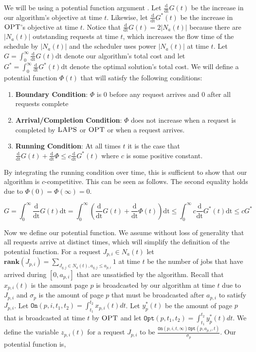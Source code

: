 \documentclass[11pt]{article}
\newcommand{\opt}{\textrm{\sc OPT}}
\newcommand{\laps}{\textrm{\sc LAPS}}
\newcommand{\On}{\texttt{On}}
\newcommand{\Opt}{\texttt{Opt}}
\newcommand{\ddphi}{\frac{\mathrm{d}}{\mathrm{dt}} \Phi}
\newcommand{\ddopt}{\frac{\mathrm{d}}{\mathrm{dt}} G^*}
\newcommand{\ddhopt}{\frac{\mathrm{d}}{\mathrm{dt}} G^*}
\newcommand{\ddg}{\frac{\mathrm{d}}{\mathrm{dt}} G}
\newcommand{\dt}{\mathrm{dt}}
\newcommand{\rank}{\mathbf{rank}}
\begin{document}
We will be using a potential function argument \cite{Edmonds00}.   Let $\ddg(t)$ be the increase in our algorithm's objective at time $t$.  Likewise, let $\ddopt(t)$ be the increase in $\opt$'s objective at time $t$. Notice that $\ddg(t) = 2|N_a(t)|$ because there are $|N_a(t)|$ outstanding requests at time $t$, which increases the flow time of the schedule by $|N_a(t)|$ and the scheduler uses power $|N_a(t)|$ at time $t$.  Let $G = \int^\infty_0 \ddg(t) \dt$ denote our algorithm's total cost and let $G^* = \int^\infty_0 \ddopt(t) \dt$ denote the optimal solution's total cost.  We will define a potential function $\Phi(t)$ that will satisfy the following conditions:

\begin{enumerate}
\item {\bf Boundary Condition}: $\Phi$ is 0 before any request arrives and $0$ after all requests complete
\item {\bf Arrival/Completion Condition}: $\Phi$ does not increase when a request is completed by $\laps$ or $\opt$ or when a request arrives.
\item {\bf Running Condition}:  At all times $t$ it is the case that $\ddg(t) + \ddphi \leq c \ddhopt(t)$ where $c$ is some positive constant.
\end{enumerate}



By integrating the running condition over time, this is sufficient to show that our algorithm is $c$-competitive. This can be seen as follows.  The second equality holds due to $\Phi(0) = \Phi(\infty) = 0$.

$$G = \int^\infty_0 \ddg(t) \dt = \int^\infty_0 (\ddg(t)  + \ddphi(t) )\dt\leq \int^\infty_0 c \ddopt(t)\dt \leq cG^*$$



Now we define our potential function.   We assume without loss of generality that all requests arrive at distinct times, which will simplify the definition of the potential function.  For a request $J_{p,i} \in N_a(t)$ let $\rank(J_{p,i}) = \sum_{J_{q,j} \in N_a(t), a_{q,j} \leq a_{p,i}}1$ at time $t$ be the number of jobs that have arrived during $[0,a_{p,i}]$  that are unsatisfied by the algorithm.  Recall that $x_{p,i}(t)$ is the amount page $p$ is broadcasted by our algorithm at time $t$ due to $J_{p,i}$ and $\sigma_p$ is the amount of page $p$ that must be broadcasted after $a_{p,i}$ to satisfy $J_{p,i}$.  Let $\On(p,i,t_1,t_2) = \int^{t_2}_{t_1} x_{p,i}(t)dt$.   Let $y^*_p(t)$ be the amount of page $p$ that is broadcasted at time $t$ by $\opt$ and let $\Opt(p,t_1,t_2) = \int^{t_2}_{t_1} y_p^*(t)dt$.  We define the variable $z_{p,i}(t)$ for a request $J_{p,i}$ to be $\frac{\On(p,i,t,\infty) \Opt(p,a_{p,i},t)}{\sigma_p}$.  Our potential function is,  
\end{document}
